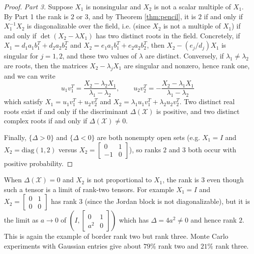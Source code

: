 \begin{proof}
    \textit{Part 3.} Suppose $X_1$ is nonsingular and $X_2$ is not a scalar multiple of $X_1$. By Part 1 the rank is $2$ or $3$, and by Theorem \ref{thm:pencil}, it is $2$ if and only if $X_1^{-1} X_2$ is diagonalizable over the field, i.e. (since $X_2$ is not a multiple of $X_1$) if and only if $\det(X_2 - \lambda X_1)$ has two distinct roots in the field. Concretely, if $X_1 = d_1 a_1 b_1^T + d_2 a_2 b_2^T$ and $X_2 = e_1 a_1 b_1^T + e_2 a_2 b_2^T$, then $X_2 - (e_j / d_j) X_1$ is singular for $j = 1, 2$, and these two values of $\lambda$ are distinct. Conversely, if $\lambda_1 \neq \lambda_2$ are roots, then the matrices $X_2 - \lambda_j X_1$ are singular and nonzero, hence rank one, and we can write
    \begin{equation}
      u_1 v_1^T = \frac{X_2 - \lambda_2 X_1}{\lambda_1 - \lambda_2}, \qquad u_2 v_2^T = -\frac{X_2 - \lambda_1 X_1}{\lambda_1 - \lambda_2}
    \end{equation}
    which satisfy $X_1 = u_1 v_1^T + u_2 v_2^T$ and $X_2 = \lambda_1 u_1 v_1^T + \lambda_2 u_2 v_2^T$. Two distinct real roots exist if and only if the discriminant $\Delta(\mathcal{X})$ is positive, and two distinct complex roots if and only if $\Delta(\mathcal{X}) \neq 0$.

    Finally, $\{\Delta > 0\}$ and $\{\Delta < 0\}$ are both nonempty open sets (e.g. $X_1 = I$ and $X_2 = \mathrm{diag}(1, 2)$ versus $X_2 = \begin{bmatrix} 0 & 1 \\ -1 & 0 \end{bmatrix}$), so ranks $2$ and $3$ both occur with positive probability.
  \end{proof}

  When $\Delta(\mathcal{X}) = 0$ and $X_2$ is not proportional to $X_1$, the rank is $3$ even though such a tensor is a limit of rank-two tensors. For example $X_1 = I$ and $X_2 = \begin{bmatrix} 0 & 1 \\ 0 & 0 \end{bmatrix}$ has rank $3$ (since the Jordan block is not diagonalizable), but it is the limit as $a \to 0$ of $(I, \begin{bmatrix} 0 & 1 \\ a^2 & 0 \end{bmatrix})$ which has $\Delta = 4a^2 \neq 0$ and hence rank $2$. This is again the example of border rank two but rank three. Monte Carlo experiments with Gaussian entries give about $79\%$ rank two and $21\%$ rank three.

